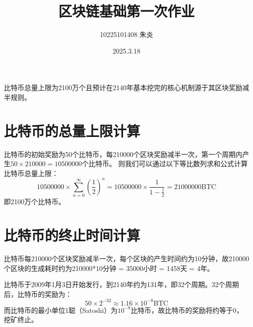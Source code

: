 \documentclass{article}
\title{区块链基础第一次作业}
\author{10225101408 朱炎}
\date{2025.3.18}
\begin{document}
\maketitle

比特币总量上限为2100万个且预计在2140年基本挖完的核心机制源于其区块奖励减半规则。

\section{比特币的总量上限计算}
比特币的初始奖励为50个比特币，每210000个区块奖励减半一次，第一个周期内产生$50 \times 210000 = 10500000$个比特币。
则我们可以通过以下等比数列求和公式计算比特币总量上限：
\begin{equation}
    10500000 \times \sum_{n=0}^{\infty} (\frac{1}{2})^n = 10500000 \times \frac{1}{1 - \frac{1}{2}} = 21000000 \text{BTC}
\end{equation}
即2100万个比特币。

\section{比特币的终止时间计算}
比特币每210000个区块奖励减半一次，每个区块的产生时间约为10分钟，故210000个区块的生成耗时约为210000*10分钟 = 35000小时 = 1458天 = 4年。

比特币于2009年1月3日开始发行，到2140年约为131年，即32个周期。32个周期后，比特币的奖励为：
\begin{equation}
    50 \times 2^{-32} \approx 1.16 \times 10^{-8} \text{BTC}
\end{equation}
而比特币的最小单位1聪（Satoshi）为$10^{-8}$比特币，故比特币的奖励将约等于0，挖矿终止。
\end{document}
